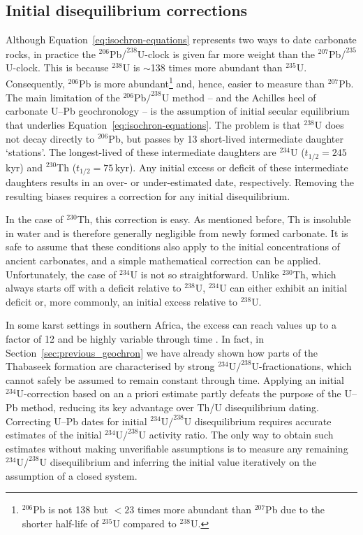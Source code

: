 \documentclass[11pt]{article}
\begin{document}
\subsection{Initial disequilibrium corrections}
\label{sec:diseq}

Although Equation~\ref{eq:isochron-equations} represents two ways to
date carbonate rocks, in practice the ${}^{206}$Pb${/}^{238}$U-clock
is given far more weight than the ${}^{207}$Pb${/}^{235}$U-clock.
This is because ${}^{238}$U is $\sim$138 times more abundant than
${}^{235}$U. Consequently, $^{206}$Pb is more
abundant\footnote{$^{206}$Pb is not 138 but $<23$ times more abundant
than ${}^{207}$Pb due to the shorter half-life of ${}^{235}$U compared
to ${}^{238}$U.} and, hence, easier to measure than ${}^{207}$Pb. The
main limitation of the ${}^{206}$Pb${/}^{238}$U method -- and the
Achilles heel of carbonate U--Pb geochronology -- is the assumption of
initial secular equilibrium that underlies
Equation~\ref{eq:isochron-equations}. The problem is that ${}^{238}$U
does not decay directly to ${}^{206}$Pb, but passes by 13 short-lived
intermediate daughter `stations'. The longest-lived of these
intermediate daughters are ${}^{234}$U ($t_{1/2}=245\,$kyr) and
${}^{230}$Th ($t_{1/2}=75\,$kyr). Any initial excess or deficit of
these intermediate daughters results in an over- or under-estimated
date, respectively. Removing the resulting biases requires a
correction for any initial disequilibrium.

In the case of ${}^{230}$Th, this correction is easy.  As mentioned
before, Th is insoluble in water and is therefore generally negligible
from newly formed carbonate. It is safe to assume that these
conditions also apply to the initial concentrations of ancient
carbonates, and a simple mathematical correction can be
applied. Unfortunately, the case of ${}^{234}$U is not so
straightforward. Unlike ${}^{230}$Th, which always starts off with a
deficit relative to ${}^{238}$U, $^{234}$U can either exhibit an
initial deficit or, more commonly, an initial excess relative to
${}^{238}$U.

In some karst settings in southern Africa, the excess can reach values
up to a factor of 12 and be highly variable through time
\citep{kronfeld1994}. In fact, in Section~\ref{sec:previous_geochron}
we have already shown how parts of the Thabaseek formation are
characterised by strong ${}^{234}$U${/}^{238}$U-fractionations, which
cannot safely be assumed to remain constant through time. Applying an
initial ${}^{234}$U-correction based on an a priori estimate partly
defeats the purpose of the U--Pb method, reducing its key advantage
over Th/U disequilibrium dating.  Correcting U--Pb dates for initial
${}^{234}$U${/}^{238}$U disequilibrium requires accurate estimates of
the initial ${}^{234}$U${/}^{238}$U activity ratio. The only way to
obtain such estimates without making unverifiable assumptions is to
measure any remaining ${}^{234}$U${/}^{238}$U disequilibrium and
inferring the initial value iteratively on the assumption of a closed
system.
\end{document}
